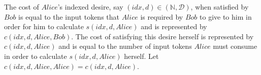 \begin{definition}
  The cost of $Alice$'s indexed desire, say $\left(idx, d\right) \in \left(\mathbb{N},
  \mathcal{D}\right)$, when satisfied by $Bob$ is equal to the input tokens that $Alice$
  is required by $Bob$ to give to him in order for him to calculate $s\left(idx, d,
  Alice\right)$ and is represented by $c\left(idx, d, Alice, Bob\right)$. The cost of
  satisfying this desire herself is represented by $c\left(idx, d, Alice\right)$ and is
  equal to the number of input tokens $Alice$ must consume in order to calculate
  $s\left(idx, d, Alice\right)$ herself. Let $c\left(idx, d, Alice, Alice\right) =
  c\left(idx, d, Alice\right)$.
\end{definition}
